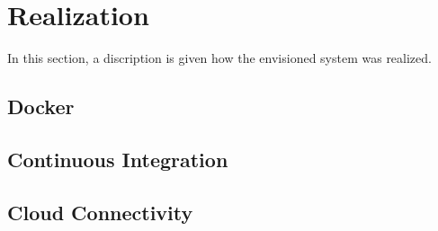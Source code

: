 
\chapter{Realization}\label{chapter:realization}

In this section, a discription is given how the envisioned system was realized.

\section{Docker}



\section{Continuous Integration}


\section{Cloud Connectivity}